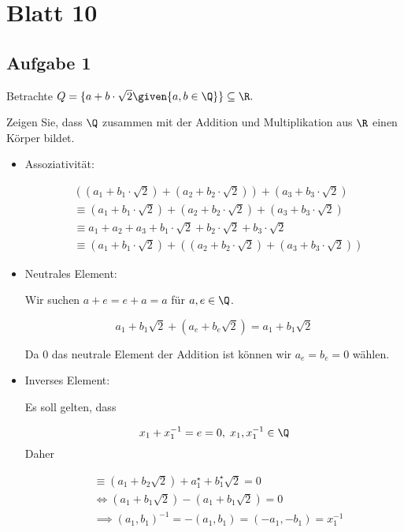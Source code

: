 \section*{Blatt 10}
%

\subsection*{Aufgabe 1}

Betrachte $Q = \{a + b \cdot \sqrt{2} \given{ a, b \in \Q}\} \subseteq \R.$

Zeigen Sie, dass $\Q$ zusammen mit der Addition und Multiplikation aus $\R$ einen Körper bildet.

\begin{itemize}
  \item Assoziativität:

  \begin{align*}
    &((a_1 + b_1 \cdot \sqrt{2}) + (a_2 + b_2 \cdot \sqrt{2})) + (a_3 + b_3 \cdot \sqrt{2}) \\
    &\equiv (a_1 + b_1 \cdot \sqrt{2}) + (a_2 + b_2 \cdot \sqrt{2}) + (a_3 + b_3 \cdot \sqrt{2}) \\
    &\equiv a_1 + a_2 + a_3 + b_1 \cdot \sqrt{2} + b_2 \cdot \sqrt{2} + b_3 \cdot \sqrt{2} \\
    &\equiv (a_1 + b_1 \cdot \sqrt{2}) + ((a_2 + b_2 \cdot \sqrt{2}) + (a_3 + b_3 \cdot \sqrt{2}))
  \end{align*}

  \item Neutrales Element:

  Wir suchen $a + e = e + a = a$ für $a, e \in \Q$.

  \[  a_1 + b_1 \sqrt{2} + (a_e + b_e \sqrt{2}) = a_1 + b_1 \sqrt{2}  \]

  Da 0 das neutrale Element der Addition ist können wir $a_e = b_e = 0$ wählen.

  \item Inverses Element:

  Es soll gelten, dass

  \[  x_1 + x_1^{-1} = e = 0, \; x_1, x_1^{-1} \in \Q  \]
 Daher

 \begin{align*}
   &\equiv (a_1 + b_2 \sqrt{2}) + a_1^{\star} + b_1^{\star}\sqrt{2} = 0 \\
   &\iff (a_1 + b_1 \sqrt{2}) - (a_1 + b_1 \sqrt{2}) = 0\\
   &\implies (a_1, b_1)^{-1} = -(a_1, b_1) = (-a_1, -b_1) = x_1^{-1}
 \end{align*}


\end{itemize}

